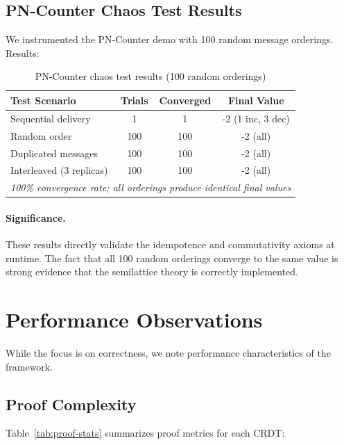 \subsection{PN-Counter Chaos Test Results}

We instrumented the PN-Counter demo with 100 random message orderings. Results:

\begin{table}[t]
  \centering
  \caption{PN-Counter chaos test results (100 random orderings)}
  \label{tab:chaos-test}
  \small
  \begin{tabular}{lccc}
    \toprule
    \textbf{Test Scenario} & \textbf{Trials} & \textbf{Converged} & \textbf{Final Value}\\
    \midrule
    Sequential delivery & 1 & 1 & -2 (1 inc, 3 dec)\\
    Random order & 100 & 100 & -2 (all)\\
    Duplicated messages & 100 & 100 & -2 (all)\\
    Interleaved (3 replicas) & 100 & 100 & -2 (all)\\
    \bottomrule
    \multicolumn{4}{l}{\small \textit{100\% convergence rate; all orderings produce identical final values}}\\
  \end{tabular}
\end{table}

\paragraph{Significance.}
These results directly validate the idempotence and commutativity axioms at runtime. The fact that all 100 random orderings converge to the same value is strong evidence that the semilattice theory is correctly implemented.

\section{Performance Observations}

While the focus is on correctness, we note performance characteristics of the framework.

\subsection{Proof Complexity}

Table~\ref{tab:proof-stats} summarizes proof metrics for each CRDT:

